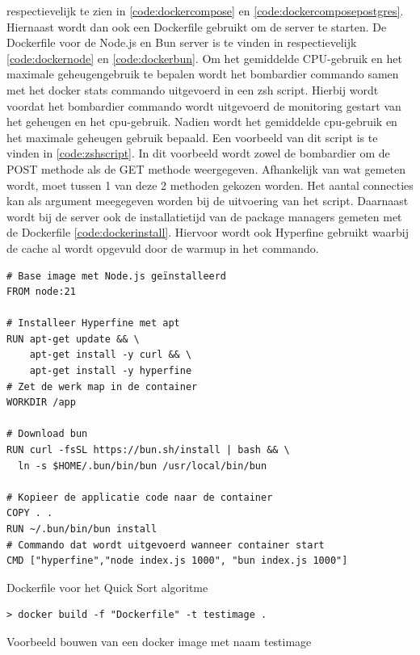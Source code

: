respectievelijk te zien in \ref{code:dockercompose} en \ref{code:dockercomposepostgres}.
Hiernaast wordt dan ook een Dockerfile gebruikt om de server te starten. De Dockerfile voor de Node.js en Bun server is te vinden in
respectievelijk \ref{code:dockernode} en \ref{code:dockerbun}. 
Om het gemiddelde CPU-gebruik en het maximale geheugengebruik te bepalen wordt het bombardier commando samen met het docker stats commando uitgevoerd in een zsh script.
Hierbij wordt voordat het bombardier commando wordt uitgevoerd de monitoring gestart van het geheugen en het cpu-gebruik. Nadien wordt het gemiddelde cpu-gebruik en het maximale geheugen gebruik bepaald.
Een voorbeeld van dit script  is te vinden in \ref{code:zshscript}. 
In dit voorbeeld wordt zowel de bombardier om de POST methode als de GET methode weergegeven. Afhankelijk van wat gemeten wordt, moet tussen 1 van deze 2 methoden gekozen worden.
Het aantal connecties kan als argument meegegeven worden bij de uitvoering van het script.
Daarnaast wordt bij de server ook de installatietijd van de package managers gemeten met de Dockerfile \ref{code:dockerinstall}.
Hiervoor wordt ook Hyperfine gebruikt waarbij de cache al wordt opgevuld door de warmup in het commando.
\begin{listing}[H]
  \centering
  \begin{verbatim}
# Base image met Node.js geïnstalleerd
FROM node:21

# Installeer Hyperfine met apt
RUN apt-get update && \
    apt-get install -y curl && \
    apt-get install -y hyperfine
# Zet de werk map in de container
WORKDIR /app

# Download bun
RUN curl -fsSL https://bun.sh/install | bash && \
  ln -s $HOME/.bun/bin/bun /usr/local/bin/bun

# Kopieer de applicatie code naar de container
COPY . .
RUN ~/.bun/bin/bun install
# Commando dat wordt uitgevoerd wanneer container start
CMD ["hyperfine","node index.js 1000", "bun index.js 1000"]
      \end{verbatim}
      \caption{\label{code:dockerscript}Dockerfile voor het Quick Sort algoritme}
\end{listing}
\begin{listing}[H]
  \centering
  \begin{verbatim}
> docker build -f "Dockerfile" -t testimage .
      \end{verbatim}
      \caption{\label{code:dockerbuild}Voorbeeld bouwen van een docker image met naam testimage}
\end{listing}
